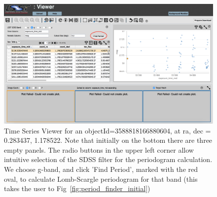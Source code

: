 \documentclass[DM,lsstdraft,toc,usenatbib]{lsstdoc}
\begin{document}
\begin{figure}
\includegraphics[width=\textwidth]{figs/PDAC_viewer_initial}
\caption{Time Series Viewer for an objectId=3588818166880604, at ra, dec = 0.283437\degree, 1.178522\degree . Note that initially on the bottom there are three empty panels. The radio buttons in the upper left corner allow  intuitive selection of the SDSS filter for the periodogram calculation. We choose g-band, and click 'Find Period', marked with the red oval, to calculate Lomb-Scargle periodogram for that band (this takes the user to Fig~\ref{fig:period_finder_initial}) }
\label{fig:time_series_viewer_initial}
\end{figure}
\end{document}
